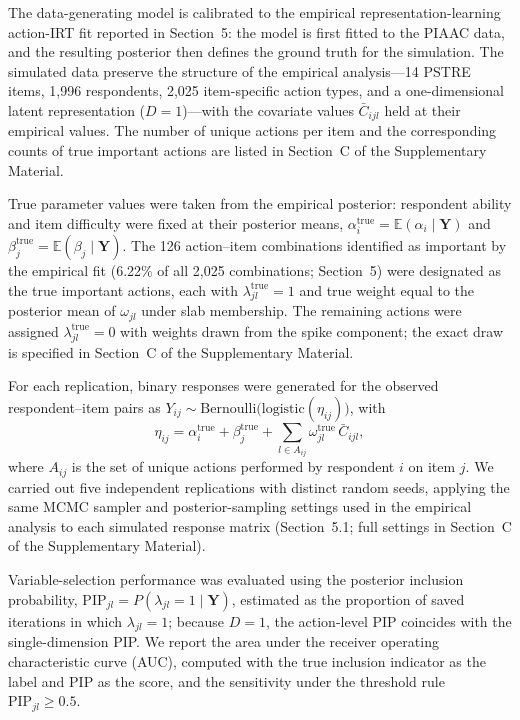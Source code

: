 \documentclass[A4paper,11pt]{article}
\begin{document}
The data-generating model is calibrated to the empirical representation-learning action-IRT fit reported in Section~5: the model is first fitted to the PIAAC data, and the resulting posterior then defines the ground truth for the simulation. The simulated data preserve the structure of the empirical analysis---14 PSTRE items, 1{,}996 respondents, 2{,}025 item-specific action types, and a one-dimensional latent representation ($D=1$)---with the covariate values $\bar{C}_{ijl}$ held at their empirical values. The number of unique actions per item and the corresponding counts of true important actions are listed in Section~C of the Supplementary Material.

True parameter values were taken from the empirical posterior: respondent ability and item difficulty were fixed at their posterior means, $\alpha_i^{\mathrm{true}}=\mathbb{E}(\alpha_i\mid\mathbf{Y})$ and $\beta_j^{\mathrm{true}}=\mathbb{E}(\beta_j\mid\mathbf{Y})$. The 126 action--item combinations identified as important by the empirical fit (6.22\% of all 2{,}025 combinations; Section~5) were designated as the true important actions, each with $\lambda_{jl}^{\mathrm{true}}=1$ and true weight equal to the posterior mean of $\omega_{jl}$ under slab membership. The remaining actions were assigned $\lambda_{jl}^{\mathrm{true}}=0$ with weights drawn from the spike component; the exact draw is specified in Section~C of the Supplementary Material.

For each replication, binary responses were generated for the observed respondent--item pairs as $Y_{ij}\sim\mathrm{Bernoulli}\bigl(\mathrm{logistic}(\eta_{ij})\bigr)$, with
\[
\eta_{ij}
=
\alpha_i^{\mathrm{true}}+\beta_j^{\mathrm{true}}
+\sum_{l\in A_{ij}}\omega_{jl}^{\mathrm{true}}\,\bar{C}_{ijl},
\]
where $A_{ij}$ is the set of unique actions performed by respondent $i$ on item $j$. We carried out five independent replications with distinct random seeds, applying the same MCMC sampler and posterior-sampling settings used in the empirical analysis to each simulated response matrix (Section~5.1; full settings in Section~C of the Supplementary Material).

Variable-selection performance was evaluated using the posterior inclusion probability, $\mathrm{PIP}_{jl}=P(\lambda_{jl}=1\mid\mathbf{Y})$, estimated as the proportion of saved iterations in which $\lambda_{jl}=1$; because $D=1$, the action-level PIP coincides with the single-dimension PIP. We report the area under the receiver operating characteristic curve (AUC), computed with the true inclusion indicator as the label and PIP as the score, and the sensitivity under the threshold rule $\mathrm{PIP}_{jl}\geq 0.5$.
\end{document}
